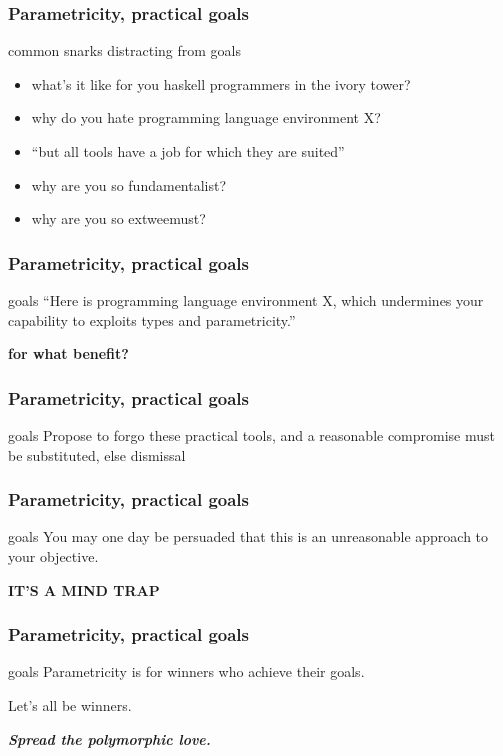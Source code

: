 \begin{frame}[fragile]
\frametitle{Parametricity, practical goals}
\begin{block}{common snarks distracting from goals}
\begin{itemize}
  \item what's it like for you haskell programmers in the ivory tower?
  \item why do you hate programming language environment X?
  \item ``but all tools have a job for which they are suited''
  \item why are you so fundamentalist?
  \item why are you so extweemust?
\end{itemize}
\end{block}
\end{frame}

\begin{frame}[fragile]
\frametitle{Parametricity, practical goals}
\begin{block}{goals}
``Here is programming language environment X, which undermines your capability to exploits types and parametricity.''
\end{block}
\textbf{for what benefit?}
\end{frame}

\begin{frame}[fragile]
\frametitle{Parametricity, practical goals}
\begin{block}{goals}
Propose to forgo these practical tools, and a reasonable compromise must be substituted, else dismissal
\end{block}
\end{frame}

\begin{frame}[fragile]
\frametitle{Parametricity, practical goals}
\begin{block}{goals}
You may one day be persuaded that this is an unreasonable approach to your objective.
\end{block}
\begin{center}
\textbf{IT'S A MIND TRAP}
\end{center}
\end{frame}

\begin{frame}[fragile]
\frametitle{Parametricity, practical goals}
\begin{block}{goals}
Parametricity is for winners who achieve their goals.

Let's all be winners.
\end{block}
\begin{center}
\textbf{\emph{Spread the polymorphic love.}}
\end{center}
\end{frame}
